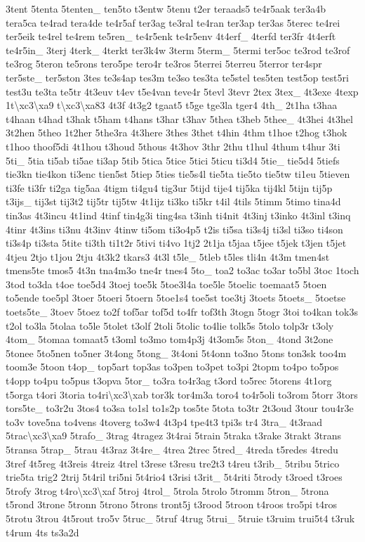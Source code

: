 {3tent 5tenta 5tenten\-\_\- ten5to t3entw 5tenu t2er teraads5 te4r5aak ter3a4b tera5ca te4rad tera4de te4r5af ter3ag te3ral te4ran ter3ap ter3as 5terec te4rei ter5eik te4rel te4rem te5ren\-\_\- te4r5enk te4r5env 4t4erf\-\_\- 4terfd ter3fr 4t4erft te4r5in\-\_\- 3terj 4terk\-\_\- 4terkt ter3k4w 3term 5term\-\_\- 5termi ter5oc te3rod te3rof te3rog 5teron te5rons tero5pe tero4r te3ros 5terrei 5terreu 5terror ter4spr ter5ste\-\_\- ter5ston 3tes te3s4ap tes3m te3so tes3ta te5stel tes5ten test5op test5ri test3u te3ta te5tr 4t3euv t4ev t5e4van teve4r 5tevl 3tevr 2tex 3tex\-\_\- 4t3exe 4texp 1t\textbackslash{}xc3\textbackslash{}xa9 t\textbackslash{}xc3\textbackslash{}xa83 4t3f 4t3g2 tgaat5 t5ge tge3la tger4 4th\-\_\- 2t1ha t3haa t4haan t4had t3hak t5ham t4hans t3har t3hav 5thea t3heb 5thee\-\_\- 4t3hei 4t3hel 3t2hen 5theo 1t2her 5the3ra 4t3here 3thes 3thet t4hin 4thm t1hoe t2hog t3hok t1hoo thoof5di 4t1hou t3houd 5thous 4t3hov 3thr 2thu t1hul 4thum t4hur 3ti 5ti\-\_\- 5tia ti5ab ti5ae ti3ap 5tib 5tica 5tice 5tici 5ticu ti3d4 5tie\-\_\- tie5d4 5tiefs tie3kn tie4kon ti3enc tien5st 5tiep 5ties tie5s4l tie5ta tie5to tie5tw ti1eu 5tieven ti3fe ti3fr ti2ga tig5aa 4tigm ti4gu4 tig3ur 5tijd tije4 tij5ka tij4kl 5tijn tij5p t3ijs\-\_\- tij3st tij3t2 tij5tr tij5tw 4t1ijz ti3ko ti5kr t4il 4tils 5timm 5timo tina4d tin3as 4t3incu 4t1ind 4tinf tin4g3i ting4sa t3inh ti4nit 4t3inj t3inko 4t3inl t3inq 4tinr 4t3ins ti3nu 4t3inv 4tinw ti5om ti3o4p5 t2is ti5sa ti3s4j ti3sl ti3so ti4son ti3s4p ti3sta 5tite ti3th ti1t2r 5tivi ti4vo 1tj2 2t1ja t5jaa t5jee t5jek t3jen t5jet 4tjeu 2tjo t1jou 2tju 4t3k2 tkars3 4t3l t5le\-\_\- 5tleb t5les tli4n 4t3m tmen4st tmens5te tmos5 4t3n tna4m3o tne4r tnes4 5to\-\_\- toa2 to3ac to3ar to5bl 3toc 1toch 3tod to3da t4oe toe5d4 3toej toe5k 5toe3l4a toe5le 5toelic toemaat5 5toen to5ende toe5pl 3toer 5toeri 5toern 5toe1s4 toe5st toe3tj 3toets 5toets\-\_\- 5toetse toets5te\-\_\- 3toev 5toez to2f tof5ar tof5d to4fr tof3th 3togn 5togr 3toi to4kan tok3s t2ol to3la 5tolaa to5le 5tolet t3olf 2toli 5tolic to4lie tolk5s 5tolo tolp3r t3oly 4tom\-\_\- 5tomaa tomaat5 t3oml to3mo tom4p3j 4t3om5s 5ton\-\_\- 4tond 3t2one 5tonee 5to5nen to5ner 3t4ong 5tong\-\_\- 3t4oni 5t4onn to3no 5tons ton3sk too4m toom3e 5toon t4op\-\_\- top5art top3as to3pen to3pet to3pi 2topm to4po to5pos t4opp to4pu to5pus t3opva 5tor\-\_\- to3ra to4r3ag t3ord to5rec 5torens 4t1org t5orga t4ori 3toria to4ri\textbackslash{}xc3\textbackslash{}xab tor3k tor4m3a toro4 to4r5oli to3rom 5torr 3tors tors5te\-\_\- to3r2u 3tos4 to3sa to1sl to1s2p tos5te 5tota to3tr 2t3oud 3tour tou4r3e to3v tove5na to4vens 4toverg to3w4 4t3p4 tpe4t3 tpi3s tr4 3tra\-\_\- 4t3raad 5trac\textbackslash{}xc3\textbackslash{}xa9 5trafo\-\_\- 3trag 4tragez 3t4rai 5train 5traka t3rake 3trakt 3trans 5transa 5trap\-\_\- 5trau 4t3raz 3t4re\-\_\- 4trea 2trec 5tred\-\_\- 4treda t5redes 4tredu 3tref 4t5reg 4t3reis 4treiz 4trel t3rese t3resu tre2t3 t4reu t3rib\-\_\- 5tribu 5trico trie5ta trig2 2trij 5t4ril tri5ni 5t4rio4 t3risi t3rit\-\_\- 5t4riti 5trody t3roed t3roes 5trofy 3trog t4ro\textbackslash{}xc3\textbackslash{}xaf 5troj 4trol\-\_\- 5trola 5trolo 5tromm 5tron\-\_\- 5trona t5rond 3trone 5tronn 5trono 5trons tront5j t3rood 5troon t4roos tro5pi t4ros 5trotu 3trou 4t5rout tro5v 5truc\-\_\- 5truf 4trug 5trui\-\_\- 5truie t3ruim trui5t4 t3ruk t4rum 4ts ts3a2d }
